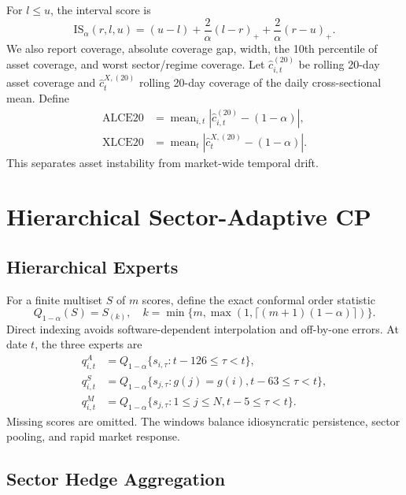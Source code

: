 \documentclass[conference]{IEEEtran}
\begin{document}
For $l\leq u$, the interval score is \cite{gneiting2007scoring}
\begin{equation}
 \mathrm{IS}_{\alpha}(r,l,u)=(u-l)+\frac{2}{\alpha}(l-r)_{+}
 +\frac{2}{\alpha}(r-u)_{+}.
 \label{eq:is}
\end{equation}
We also report coverage, absolute coverage gap, width, the 10th percentile of asset coverage, and worst sector/regime coverage. Let $\widehat c_{i,t}^{(20)}$ be rolling 20-day asset coverage and $\widehat c_{t}^{X,(20)}$ rolling 20-day coverage of the daily cross-sectional mean. Define
\begin{align}
 \mathrm{ALCE20}&=\operatorname{mean}_{i,t}|\widehat c_{i,t}^{(20)}-(1-\alpha)|,\\
 \mathrm{XLCE20}&=\operatorname{mean}_{t}|\widehat c_{t}^{X,(20)}-(1-\alpha)|.
\end{align}
This separates asset instability from market-wide temporal drift.

\section{Hierarchical Sector-Adaptive CP}

\subsection{Hierarchical Experts}

For a finite multiset $S$ of $m$ scores, define the exact conformal order statistic
\begin{equation}
 Q_{1-\alpha}(S)=S_{(k)},\quad
 k=\min\{m,\max(1,\lceil(m+1)(1-\alpha)\rceil)\}.
 \label{eq:cquantile}
\end{equation}
Direct indexing avoids software-dependent interpolation and off-by-one errors. At date $t$, the three experts are
\begin{align}
 q^A_{i,t}&=Q_{1-\alpha}\{s_{i,\tau}:t-126\leq\tau<t\},\\
 q^S_{i,t}&=Q_{1-\alpha}\{s_{j,\tau}:g(j)=g(i),t-63\leq\tau<t\},\\
 q^M_{i,t}&=Q_{1-\alpha}\{s_{j,\tau}:1\leq j\leq N,t-5\leq\tau<t\}.
\end{align}
Missing scores are omitted. The windows balance idiosyncratic persistence, sector pooling, and rapid market response.

\subsection{Sector Hedge Aggregation}
\end{document}
